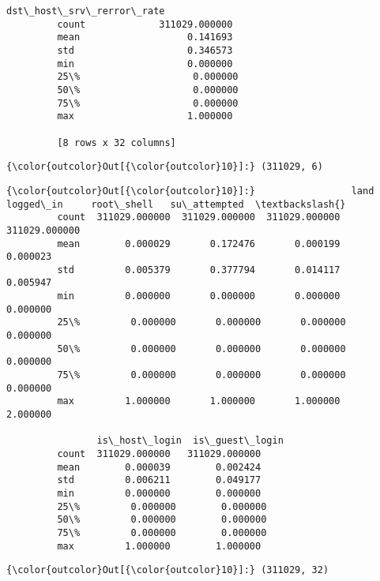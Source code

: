 \documentclass[11pt]{article}
\begin{document}
\begin{Verbatim}[commandchars=\\\{\}]
                dst\_host\_srv\_rerror\_rate  
         count             311029.000000  
         mean                   0.141693  
         std                    0.346573  
         min                    0.000000  
         25\%                    0.000000  
         50\%                    0.000000  
         75\%                    0.000000  
         max                    1.000000  
         
         [8 rows x 32 columns]
\end{Verbatim}
            
\begin{Verbatim}[commandchars=\\\{\}]
{\color{outcolor}Out[{\color{outcolor}10}]:} (311029, 6)
\end{Verbatim}
            
\begin{Verbatim}[commandchars=\\\{\}]
{\color{outcolor}Out[{\color{outcolor}10}]:}                 land      logged\_in     root\_shell   su\_attempted  \textbackslash{}
         count  311029.000000  311029.000000  311029.000000  311029.000000   
         mean        0.000029       0.172476       0.000199       0.000023   
         std         0.005379       0.377794       0.014117       0.005947   
         min         0.000000       0.000000       0.000000       0.000000   
         25\%         0.000000       0.000000       0.000000       0.000000   
         50\%         0.000000       0.000000       0.000000       0.000000   
         75\%         0.000000       0.000000       0.000000       0.000000   
         max         1.000000       1.000000       1.000000       2.000000   
         
                is\_host\_login  is\_guest\_login  
         count  311029.000000   311029.000000  
         mean        0.000039        0.002424  
         std         0.006211        0.049177  
         min         0.000000        0.000000  
         25\%         0.000000        0.000000  
         50\%         0.000000        0.000000  
         75\%         0.000000        0.000000  
         max         1.000000        1.000000  
\end{Verbatim}
            
\begin{Verbatim}[commandchars=\\\{\}]
{\color{outcolor}Out[{\color{outcolor}10}]:} (311029, 32)
\end{Verbatim}
            
\end{document}
